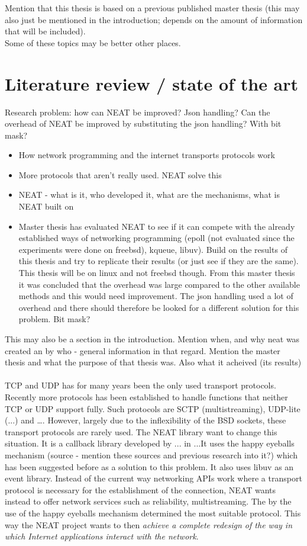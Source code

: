 \documentclass[12pt]{report}
\begin{document}
Mention that this thesis is based on a previous published master thesis (this may also just be mentioned in the introduction; depends on the amount of information that will be included). \\
Some of these topics may be better other places.

\section{Literature review / state of the art}
Research problem: how can NEAT be improved? Json handling? Can the overhead of NEAT be improved by substituting the json handling? With bit mask?
\begin{itemize}
\item How network programming and the internet transports protocols work
\item More protocols that aren’t really used. NEAT solve this
\item NEAT - what is it, who developed it, what are the mechanisms, what is NEAT built on
\item Master thesis has evaluated NEAT to see if it can compete with the already established ways of networking programming (epoll (not evaluated since the experiments were done on freebsd), kqueue, libuv). Build on the results of this thesis and try to replicate their results (or just see if they are the same). This thesis will be on linux and not freebsd though. From this master thesis it was concluded that the overhead was large compared to the other available methods and this would need improvement. The json handling used a lot of overhead and there should therefore be looked for a different solution for this problem. Bit mask?
\end{itemize}
This may also be a section in the introduction. Mention when, and why neat was created an by who - general information in that regard. Mention the master thesis and what the purpose of that thesis was. Also what it acheived (its results) \\
\\
TCP and UDP has for many years been the only used transport protocols. Recently more protocols has been established to handle functions that neither TCP or UDP support fully. Such protocols are SCTP (multistreaming), UDP-lite (...) and …. However, largely due to the inflexibility of the BSD sockets, these transport protocols are rarely used. The NEAT library want to change this situation. It is a callback library developed by ... in ...It uses the happy eyeballs mechanism (source - mention these sources and previous research into it?) which has been suggested before as a solution to this problem. It also uses libuv as an event library. Instead of the current way networking APIs work where a transport protocol is necessary for the establishment of the connection, NEAT wants instead to offer network services such as reliability, multistreaming. The by the use of the happy eyeballs mechanism determined the most suitable protocol. This way the NEAT project wants to then \textit{achieve a complete redesign of the way in which Internet applications interact with the network}. 
\end{document}

